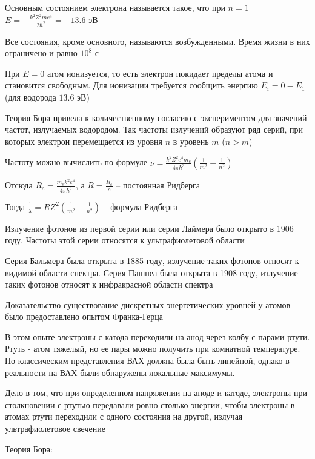 \documentclass[12pt]{article}
\begin{document}
Основным состоянием электрона называется такое, что при $n = 1$ $E = -\frac{k^2 Z^2 m e^4}{2\hbar^2} = -13.6$ эВ 

Все состояния, кроме основного, называются возбужденными. Время жизни в них ограничено и равно $10^8$ с

При $E = 0$ атом ионизуется, то есть электрон покидает пределы атома и становится свободным. Для ионизации требуется сообщить энергию $E_i = 0 - E_1$ (для водорода $13.6$ эВ)

\mediumvspace

Теория Бора привела к количественному согласию с экспериментом для значений частот, излучаемых водородом. Так частоты излучений образуют ряд серий, при которых электрон перемещается из уровня $n$ в уровень $m$ ($n > m$)

Частоту можно вычислить по формуле $\nu = \frac{k^2 Z^2 e^4 m_e}{4 \pi \hbar^3} \left(\frac{1}{m^2} - \frac{1}{n^2}\right)$

Отсюда $R_c = \frac{m_e k^2 e^4}{4 \pi \hbar^3}$, а $R = \frac{R_c}{c}$ -- постоянная Ридберга

Тогда $\frac{1}{\lambda} = R Z^2 \left(\frac{1}{m^2} - \frac{1}{n^2}\right)$ -- формула Ридберга

Излучение фотонов из первой серии или серии Лаймера было открыто в 1906 году. Частоты этой серии относятся к ультрафиолетовой области

Серия Бальмера была открыта в 1885 году, излучение таких фотонов относят к видимой области спектра. Серия Пашнеа была открыта в 1908 году, излучение таких фотонов относят к инфракрасной области спектра

\mediumvspace

Доказательство существование дискретных энергетических уровней у атомов было предоставлено опытом Франка-Герца

В этом опыте электроны с катода переходили на анод через колбу с парами ртути. Ртуть - атом тяжелый, но ее пары можно получить при комнатной температуре. По классическим представления ВАХ должна была быть линейной, однако в реальности на ВАХ были обнаружены локальные максимумы. 

Дело в том, что при определенном напряжении на аноде и катоде, электроны при столкновении с ртутью передавали ровно столько энергии, чтобы электроны в атомах ртути переходили с одного состояния на другой, излучая ультрафиолетовое свечение

\mediumvspace

Теория Бора:
\end{document}
